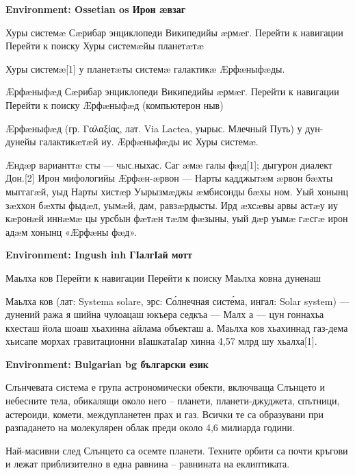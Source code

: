 \documentclass{article}
\begin{document}
\bigskip
{\forig \bfseries Environment: Ossetian os Ирон æвзаг}\par
\begin{cyrtranse}
Хуры системæ
Сæрибар энциклопеди Википедийы æрмæг.
Перейти к навигации
Перейти к поиску
Хуры системæйы планетæтæ

Хуры системæ[1] у планетæты системæ галактикæ Æрфæныфæды. 

Æрфæныфæд
Сæрибар энциклопеди Википедийы æрмæг.
Перейти к навигации
Перейти к поиску
Æрфæныфæд (компьютерон ныв)

Æрфæныфæд (гр. {\forig Γαλαξίας}, лат. {\forig Via Lactea}, уырыс. Млечный Путь) у дун-дунейы галактикæтæй иу. Æрфæныфæды ис Хуры системæ.

Æндæр варианттæ сты — чыс.ныхас. Саг æмæ галы фæд[1]; дыгурон диалект Дон.[2]
Ирон мифологийы
Æрфæн-æрвон — Нарты кадджытæм æрвон бæхты мыггагæй, уыд Нарты хистæр Уырызмæджы æмбисонды бæхы ном. Уый хонынц зæххон бæхты фыдæл, уымæй, дам, равзæрдысты. Ирд æхсæвы арвы астæу иу кæронæй иннæмæ цы урсбын фæтæн тæлм фæзыны, уый дæр уымæ гæсгæ ирон адæм хонынц «Æрфæны фæд». 
\end{cyrtranse}

\bigskip
{\forig \bfseries Environment: Ingush inh ГӀалгӀай мотт}\par
\begin{cyrtranse}
Маьлха ков
Перейти к навигации
Перейти к поиску
Маьлха ковна дуненаш

Маьлха ков (лат: {\forig Systema solare}, эрс: Со́лнечная систе́ма, ингал: {\forig Solar system}) — дунений ража я шийна чулоацаш юкъера седкъа — Малх а — цун гоннахьа кхесташ йола шоаш хьахинна айлама объекташ а. Маьлха ков хьахиннад газ-дема хьисапе морхах гравитационни вIашкатаIар хинна 4,57 млрд шу хьалха[1]. 
\end{cyrtranse}

\bigskip
{\forig \bfseries Environment: Bulgarian bg български език}\par
\begin{cyrtranse}
Слънчевата система е група астрономически обекти, включваща Слънцето и небесните тела, обикалящи около него – планети, планети-джуджета, спътници, астероиди, комети, междупланетен прах и газ. Всички те са образувани при разпадането на молекулярен облак преди около 4,6 милиарда години.

Най-масивни след Слънцето са осемте планети. Техните орбити са почти кръгови и лежат приблизително в една равнина – равнината на еклиптиката. 
\end{cyrtranse}
\end{document}
